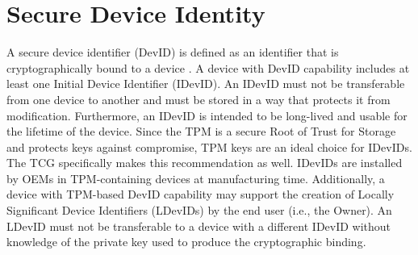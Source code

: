 \chapter{Secure Device Identity}


A secure device identifier (DevID) is defined as an identifier that is cryptographically bound to a device \cite{DevIDSpec-IEEE}. A device with DevID capability includes at least one Initial Device Identifier (IDevID). An IDevID must not be transferable from one device to another and must be stored in a way that protects it from modification. Furthermore, an IDevID is intended to be long-lived and usable for the lifetime of the device. Since the TPM is a secure Root of Trust for Storage and protects keys against compromise, TPM keys are an ideal choice for IDevIDs. The TCG specifically makes this recommendation as well. IDevIDs are installed by OEMs in TPM-containing devices at manufacturing time. Additionally, a device with TPM-based DevID capability may support the creation of Locally Significant Device Identifiers (LDevIDs) by the end user (i.e., the Owner). An LDevID must not be transferable to a device with a different IDevID without knowledge of the private key used to produce the cryptographic binding. 



